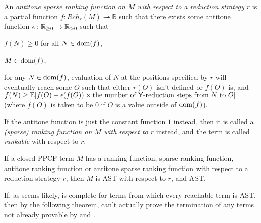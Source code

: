 \begin{definition}
An \emph{antitone sparse ranking function on $M$ with respect to a reduction strategy $r$} is a partial function $f : \mathit{Rch}_r(M) \rightharpoonup \mathbb R$ such that there exists some antitone function $\epsilon : \mathbb{R}_{{\geq}0} \to \mathbb{R}_{{>}0}$ such that
\begin{inparaenum}[(i)]
    \item $f(N) \geq 0$ for all $N \in \operatorname{dom}(f)$,
    \item $M \in \operatorname{dom}(f)$,
    \item for any $N \in \operatorname{dom}(f)$, evaluation of $N$ at the positions specified by $r$ will eventually reach some $O$ such that either $r(O)$ isn't defined or $f(O)$ is, and $f(N) \geq \mathbb E[f(O) + \epsilon(f(O)) \times \text{the number of $\tY$-reduction steps from $N$ to $O$}]$ (where $f(O)$ is taken to be 0 if $O$ is a value outside of $\operatorname{dom}(f)$).
\end{inparaenum}
\iffalse
\begin{itemize}
    \item $f(N) \geq 0$ for all $N$ where $f$ is defined.
    \item $f$ is defined at $M$.
    \item For any $N$ in the domain of definition of $f$, evaluation of $N$ at the positions specified by $r$ will eventually reach some $O$ such that either $r(O)$ isn't defined or $f(O)$ is, and $f(N) \geq \mathbb E[f(O) + \epsilon(f(O)) \times \text{the number of $\tY$-reduction steps from $N$ to $O$}]$ (where $f(O)$ is taken to be 0 if $O$ is a value outside of the domain of $f$).
\end{itemize}
\fi
\end{definition}

If the antitone function is just the constant function $1$ instead, then it is called a \emph{(sparse) ranking function on $M$ with respect to $r$} instead, and the term is called \emph{rankable} with respect to $r$.

\begin{theorem} \label{thm:confluent ranking}
If a closed PPCF term $M$ has a ranking function, sparse ranking function, antitone ranking function or antitone sparse ranking function with respect to a reduction strategy $r$, then $M$ is AST with respect to $r$, and AST.
\end{theorem}

\medskip
If, as seems likely,  is complete for terms from which every reachable term is AST, then by the following theorem,  can't actually prove the termination of any terms not already provable by  and .

